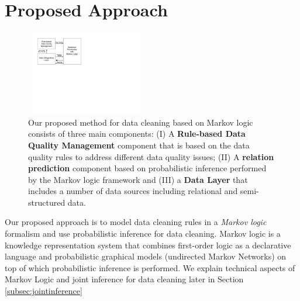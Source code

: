 
\section{Proposed Approach}
\label{sec:method}


 \begin{figure}[t]
 \centering
 \includegraphics[width=200px, height=140px]{img/system.pdf}
 \caption{%
 Our proposed method for data cleaning based on Markov logic consists of three main components: 
 (I) A \textbf{Rule-based Data Quality Management} component that is based on the data quality rules to address different data quality issues;
 (II) A \textbf{relation prediction} component based on probabilistic inference performed by the Markov logic framework and (III) 
 a \textbf{Data Layer} that includes a number of data sources including relational and semi-structured data.}
 \label{fig:system}
\end{figure}     

Our proposed approach is to model data cleaning rules in a \textit{Markov logic}~\cite{domingos2009markov} formalism and use probabilistic inference for data cleaning. Markov logic is a knowledge representation system that combines first-order logic as a declarative language and probabilistic graphical models (undirected Markov Networks) on top of which probabilistic inference is performed. We explain technical aspects of Markov Logic and joint inference for data cleaning later in Section \ref{subsec:jointinference}

